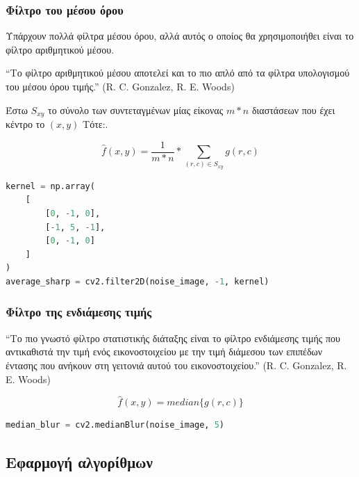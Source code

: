 \subsubsection{Φίλτρο του μέσου όρου}

Υπάρχουν πολλά φίλτρα μέσου όρου, αλλά αυτός ο οποίος θα χρησιμοποιήθει είναι το φίλτρο αριθμητικού μέσου.

\begin{problem}
	``Το φίλτρο αριθμητικού μέσου αποτελεί και το πιο απλό από τα φίλτρα υπολογισμού του μέσου όρου τιμής.'' 
	(R. C. Gonzalez, R. E. Woods) \par
	Έστω $ S_{xy} $ το σύνολο των συντεταγμένων μίας είκονας $ m * n $ διαστάσεων που έχει κέντρο το $ (x, y) $ Τότε:.

	\begin{equation}
		\hat{f}(x, y) = \frac{1}{m * n} * \sum_{(r, c) \in S_{xy}} g(r, c)
	\end{equation}
\end{problem}

\begin{lstlisting}[language=Python, caption=Average Sharp]
kernel = np.array(
    [   
        [0, -1, 0],
        [-1, 5, -1],
        [0, -1, 0]
    ]
)
average_sharp = cv2.filter2D(noise_image, -1, kernel)
\end{lstlisting}

\subsubsection{Φίλτρο της ενδιάμεσης τιμής}

\begin{problem}
	``Το πιο γνωστό φίλτρο στατιστικής διάταξης είναι το φίλτρο ενδιάμεσης τιμής που αντικαθιστά την τιμή ενός εικονοστοιχείου με την τιμή διάμεσου των επιπέδων έντασης που ανήκουν στη γειτονιά αυτού του εικονοστοιχείου.''
	(R. C. Gonzalez, R. E. Woods)

	\begin{equation}
		\hat{f}(x, y) = median\{g(r, c)\}
	\end{equation}
\end{problem}

\begin{lstlisting}[language=Python, caption=Median Blur]
median_blur = cv2.medianBlur(noise_image, 5)
\end{lstlisting}

\subsection{Εφαρμογή αλγορίθμων}

